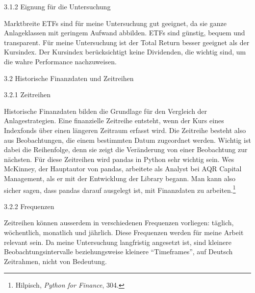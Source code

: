 \documentclass[
  ngerman,
  a4paper,
  DIV=11,
  oneside]{scrreprt}
\begin{document}
3.1.2 Eignung für die Untersuchung

Marktbreite ETFs sind für meine Untersuchung gut geeignet, da sie ganze
Anlageklassen mit geringem Aufwand abbilden. ETFs sind günstig, bequem
und transparent. Für meine Untersuchung ist der Total Return besser
geeignet als der Kursindex. Der Kursindex berücksichtigt keine
Dividenden, die wichtig sind, um die wahre Performance nachzuweisen.

3.2 Historische Finanzdaten und Zeitreihen

3.2.1 Zeitreihen

Historische Finanzdaten bilden die Grundlage für den Vergleich der
Anlagestrategien. Eine finanzielle Zeitreihe entsteht, wenn der Kurs
eines Indexfonds über einen längeren Zeitraum erfasst wird. Die
Zeitreihe besteht also aus Beobachtungen, die einem bestimmten Datum
zugeordnet werden. Wichtig ist dabei die Reihenfolge, denn sie zeigt die
Veränderung von einer Beobachtung zur nächsten. Für diese Zeitreihen
wird pandas in Python sehr wichtig sein. Wes McKinney, der Hauptautor
von pandas, arbeitete als Analyst bei AQR Capital Management, als er mit
der Entwicklung der Library begann. Man kann also sicher sagen, dass
pandas darauf ausgelegt ist, mit Finanzdaten zu arbeiten.\footnote{Hilpisch,
  \emph{Python for Finance}, 304.}

3.2.2 Frequenzen

Zeitreihen können ausserdem in verschiedenen Frequenzen vorliegen:
täglich, wöchentlich, monatlich und jährlich. Diese Frequenzen werden
für meine Arbeit relevant sein. Da meine Untersuchung langfristig
angesetzt ist, sind kleinere Beobachtungsintervalle beziehungsweise
kleinere ``Timeframes'', auf Deutsch Zeitrahmen, nicht von Bedeutung.
\end{document}
